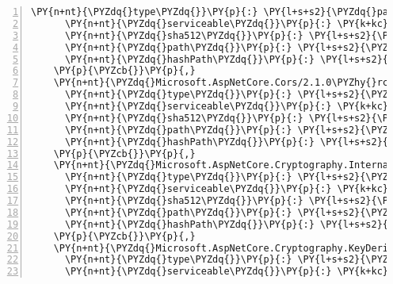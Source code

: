 \begin{Verbatim}[commandchars=\\\{\},numbers=left,firstnumber=1,stepnumber=1,numberblanklines=0]
      \PY{n+nt}{\PYZdq{}type\PYZdq{}}\PY{p}{:} \PY{l+s+s2}{\PYZdq{}package\PYZdq{}}\PY{p}{,}
      \PY{n+nt}{\PYZdq{}serviceable\PYZdq{}}\PY{p}{:} \PY{k+kc}{true}\PY{p}{,}
      \PY{n+nt}{\PYZdq{}sha512\PYZdq{}}\PY{p}{:} \PY{l+s+s2}{\PYZdq{}sha512\PYZhy{}BQXjJwyh7Euct2F+3FXN5HsZrx4uOHmYzzV3WPfSkOARtzmwLxTnviZICHiAXYZhSud7K2q9l7c5mk5KB9FCZA==\PYZdq{}}\PY{p}{,}
      \PY{n+nt}{\PYZdq{}path\PYZdq{}}\PY{p}{:} \PY{l+s+s2}{\PYZdq{}microsoft.aspnetcore.cookiepolicy/2.1.0\PYZhy{}rc1\PYZhy{}final\PYZdq{}}\PY{p}{,}
      \PY{n+nt}{\PYZdq{}hashPath\PYZdq{}}\PY{p}{:} \PY{l+s+s2}{\PYZdq{}microsoft.aspnetcore.cookiepolicy.2.1.0\PYZhy{}rc1\PYZhy{}final.nupkg.sha512\PYZdq{}}
    \PY{p}{\PYZcb{}}\PY{p}{,}
    \PY{n+nt}{\PYZdq{}Microsoft.AspNetCore.Cors/2.1.0\PYZhy{}rc1\PYZhy{}final\PYZdq{}}\PY{p}{:} \PY{p}{\PYZob{}}
      \PY{n+nt}{\PYZdq{}type\PYZdq{}}\PY{p}{:} \PY{l+s+s2}{\PYZdq{}package\PYZdq{}}\PY{p}{,}
      \PY{n+nt}{\PYZdq{}serviceable\PYZdq{}}\PY{p}{:} \PY{k+kc}{true}\PY{p}{,}
      \PY{n+nt}{\PYZdq{}sha512\PYZdq{}}\PY{p}{:} \PY{l+s+s2}{\PYZdq{}sha512\PYZhy{}J0UNRtymDDzOasiZvlQKRKBdTmfHjdjSEBKYUgyajB0fbmN3OtcdApPwc2/gj09H2o3feW63fPAQErgDXlmEsQ==\PYZdq{}}\PY{p}{,}
      \PY{n+nt}{\PYZdq{}path\PYZdq{}}\PY{p}{:} \PY{l+s+s2}{\PYZdq{}microsoft.aspnetcore.cors/2.1.0\PYZhy{}rc1\PYZhy{}final\PYZdq{}}\PY{p}{,}
      \PY{n+nt}{\PYZdq{}hashPath\PYZdq{}}\PY{p}{:} \PY{l+s+s2}{\PYZdq{}microsoft.aspnetcore.cors.2.1.0\PYZhy{}rc1\PYZhy{}final.nupkg.sha512\PYZdq{}}
    \PY{p}{\PYZcb{}}\PY{p}{,}
    \PY{n+nt}{\PYZdq{}Microsoft.AspNetCore.Cryptography.Internal/2.1.0\PYZhy{}rc1\PYZhy{}final\PYZdq{}}\PY{p}{:} \PY{p}{\PYZob{}}
      \PY{n+nt}{\PYZdq{}type\PYZdq{}}\PY{p}{:} \PY{l+s+s2}{\PYZdq{}package\PYZdq{}}\PY{p}{,}
      \PY{n+nt}{\PYZdq{}serviceable\PYZdq{}}\PY{p}{:} \PY{k+kc}{true}\PY{p}{,}
      \PY{n+nt}{\PYZdq{}sha512\PYZdq{}}\PY{p}{:} \PY{l+s+s2}{\PYZdq{}sha512\PYZhy{}HIdleZdrK9YCxsqNHbQgVcVgNTS+e5q3cdyZDkprFkwPEG9OrWhsMIPvrPBqVT5pQWZfA+/moLgjokWqp68FXA==\PYZdq{}}\PY{p}{,}
      \PY{n+nt}{\PYZdq{}path\PYZdq{}}\PY{p}{:} \PY{l+s+s2}{\PYZdq{}microsoft.aspnetcore.cryptography.internal/2.1.0\PYZhy{}rc1\PYZhy{}final\PYZdq{}}\PY{p}{,}
      \PY{n+nt}{\PYZdq{}hashPath\PYZdq{}}\PY{p}{:} \PY{l+s+s2}{\PYZdq{}microsoft.aspnetcore.cryptography.internal.2.1.0\PYZhy{}rc1\PYZhy{}final.nupkg.sha512\PYZdq{}}
    \PY{p}{\PYZcb{}}\PY{p}{,}
    \PY{n+nt}{\PYZdq{}Microsoft.AspNetCore.Cryptography.KeyDerivation/2.1.0\PYZhy{}rc1\PYZhy{}final\PYZdq{}}\PY{p}{:} \PY{p}{\PYZob{}}
      \PY{n+nt}{\PYZdq{}type\PYZdq{}}\PY{p}{:} \PY{l+s+s2}{\PYZdq{}package\PYZdq{}}\PY{p}{,}
      \PY{n+nt}{\PYZdq{}serviceable\PYZdq{}}\PY{p}{:} \PY{k+kc}{true}\PY{p}{,}

\end{Verbatim}
